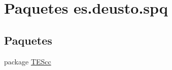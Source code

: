\hypertarget{namespacees_1_1deusto_1_1spq}{\section{Paquetes es.\+deusto.\+spq}
\label{namespacees_1_1deusto_1_1spq}
}
\subsection*{Paquetes}
\begin{DoxyCompactItemize}
\item 
package \hyperlink{namespacees_1_1deusto_1_1spq_1_1_t_e_scc}{T\+E\+Scc}
\end{DoxyCompactItemize}
